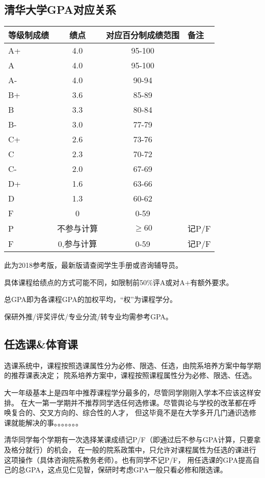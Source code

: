 \documentclass{article}
\begin{document}
\subsection{清华大学GPA对应关系}
\begin{tabular}{l|c|c|l}
    \hline
    等级制成绩&绩点&对应百分制成绩范围&备注\\
    \hline
    A+&4.0&95-100& \\
    A&4.0&95-100& \\
    A-&4.0&90-94& \\
    B+&3.6&85-89& \\
    B&3.3&80-84& \\
    B-&3.0&77-79& \\
    C+&2.6&73-76& \\
    C&2.3&70-72& \\
    C-&2.0&67-69& \\
    D+&1.6&63-66& \\
    D&1.3&60-62& \\
    F&0&0-59& \\
    P&不参与计算&$\geq60$&记P/F\\
    F&0,参与计算&0-59&记P/F\\
    \hline
\end{tabular}
\bigskip

此为2018参考版，最新版请查阅学生手册或咨询辅导员。

具体课程给绩点的方式可能不同，如限制前50\textnormal{\%}评A或对A+有额外要求。

总GPA即为各课程GPA的加权平均，“权”为课程学分。

保研外推/评奖评优/专业分流/转专业均需参考GPA。

\subsection{任选课\textnormal{\&}体育课}
选课系统中，课程按照选课属性分为必修、限选、任选，由院系培养方案中每学期的推荐课表决定；
院系培养方案中，课程按照课程属性分为必修、限选、任选。

大一年级基本上是四年中推荐课程学分最多的，尽管同学刚刚入学本不应该这样安排。
在大一第一学期并不推荐同学选任何选修课。尽管舆论与学校的改革都在呼唤复合的、交叉方向的、综合性的人才，
但这毕竟不是在大学多开几门通识选修课就能解决的事。。。。。。。

清华同学每个学期有一次选择某课成绩记P/F（即通过后不参与GPA计算，只要拿及格分就行）的机会，
在一般的院系政策中，只允许对课程属性为任选的课进行这项操作（具体咨询院系教务老师）。也有同学不记P/F，
用任选课的GPA提高自己的总GPA，这点见仁见智，保研时考虑GPA一般只看必修和限选课。
\end{document}
